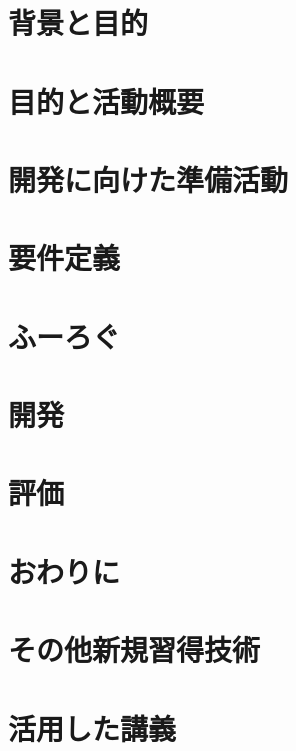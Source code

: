\documentclass[openany,11pt,papersize]{jsbook}
\begin{document}
%
\maketitle

\frontmatter



\tableofcontents%

\mainmatter%


\chapter{背景と目的}



\chapter{目的と活動概要}



\chapter{開発に向けた準備活動}



\chapter{要件定義}



\chapter{ふーろぐ}



\chapter{開発}



\chapter{評価}



\chapter{おわりに}



\begin{appendix}
  \chapter{その他新規習得技術}
  

  \chapter{活用した講義}
  

\end{appendix}
\end{document}

